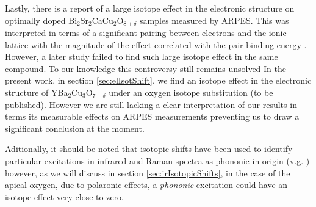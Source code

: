 Lastly, there is a report of a large isotope effect in the electronic structure on optimally doped Bi$_2$Sr$_2$CaCu$_2$O$_{8+\delta}$ samples measured by ARPES. 
This was interpreted in terms of a significant pairing between electrons and the ionic lattice with the magnitude of the effect correlated with the pair binding energy \cite{Gweon2004}.
However, a later study failed to find such large isotope effect \cite{Douglas2007} in the same compound.
To our knowledge this controversy still remains unsolved
In the present work, in section \ref{sec:elIsotShift}, we find an isotope effect in the electronic structure of YBa$_2$Cu$_3$O$_{7-\delta}$ under an oxygen isotope substitution (to be published).
However we are still lacking a clear interpretation of our results in terms its measurable effects on ARPES measurements preventing us to draw a significant conclusion at the moment.

Aditionally, it should be noted that isotopic shifts have been used to identify particular excitations in infrared and Raman spectra as phononic in origin (v.g. \cite{Thomsen1990}) however, as we will discuss in section \ref{sec:irIsotopicShifts}, in the case of the apical oxygen, due to polaronic effects, a \textit{phononic} excitation could have an isotope effect very close to zero.
